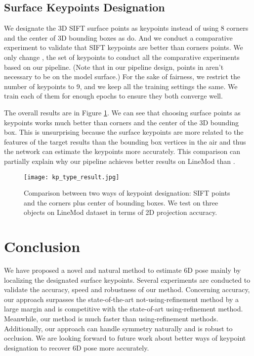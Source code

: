 \documentclass[10pt,twocolumn,letterpaper]{article}
\begin{document}
\subsection{Surface Keypoints Designation}
\label{sec:choosing keypoints}
We designate the 3D SIFT surface points as keypoints instead of using 8 corners and the center of 3D bounding boxes as \cite{Rad2017BB8AS,tekin18} do. And we conduct a comparative experiment to validate that SIFT keypoints are better than corners points. We only change , the set of keypoints to conduct all the comparative experiments based on our pipeline. (Note that in our pipeline design, points in  aren't necessary to be on the model surface.) For the sake of fairness, we restrict the number of keypoints to 9, and we keep all the training settings the same. We train each of them for enough epochs to ensure they both converge well.

The overall results are in Figure \ref{fig:diff_ways}. We can see that choosing surface points as keypoints works much better than corners and the center of the 3D bounding box. This is unsurprising because the surface keypoints are more related to the features of the target results than the bounding box vertices in the air and thus the network can estimate the keypoints more accurately. This comparison can partially explain why our pipeline achieves better results on LineMod than \cite{Rad2017BB8AS,tekin18}.

\begin{figure}[t]
\begin{center}
   \texttt{[image: kp\_type\_result.jpg]}
\end{center}
   \caption{Comparison between two ways of keypoint designation: SIFT points and the corners plus center of bounding boxes. We test on three objects on LineMod dataset in terms of 2D projection accuracy.}
\label{fig:diff_ways}
\end{figure}

\section{Conclusion}
We have proposed a novel and natural method to estimate 6D pose mainly by localizing the designated surface keypoints. Several experiments are conducted to validate the accuracy, speed and robustness of our method. Concerning accuracy, our approach surpasses the state-of-the-art not-using-refinement method by a large margin and is competitive with the state-of-art using-refinement method. Meanwhile, our method is much faster than using-refinement methods. Additionally, our approach can handle symmetry naturally and is robust to occlusion. We are looking forward to future work about better ways of keypoint designation to recover 6D pose more accurately.





{\small


}
\end{document}
